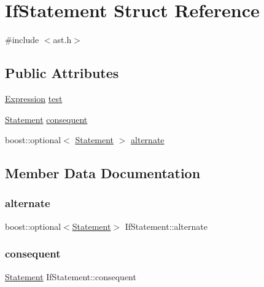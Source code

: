 \hypertarget{struct_if_statement}{}\section{If\+Statement Struct Reference}
\label{struct_if_statement}


{\ttfamily \#include $<$ast.\+h$>$}

\subsection*{Public Attributes}
\begin{DoxyCompactItemize}
\item 
\hyperlink{ast_8h_a4cb273a4d960cd13ea17d08f254493e8}{Expression} \hyperlink{struct_if_statement_aaabaa9e831e2bb8e0efac3b72e46ffc9}{test}
\item 
\hyperlink{ast_8h_a8b6ddf3732a0acd77e6b2509fb21a5fd}{Statement} \hyperlink{struct_if_statement_a3d850e94b88823553ee5bc81a28f0d55}{consequent}
\item 
boost\+::optional$<$ \hyperlink{ast_8h_a8b6ddf3732a0acd77e6b2509fb21a5fd}{Statement} $>$ \hyperlink{struct_if_statement_a34abc419c35b1bdab392dd63b09fd659}{alternate}
\end{DoxyCompactItemize}


\subsection{Member Data Documentation}
\mbox{\label{struct_if_statement_a34abc419c35b1bdab392dd63b09fd659}} 
\subsubsection{\texorpdfstring{alternate}{alternate}}
{\footnotesize\ttfamily boost\+::optional$<$\hyperlink{ast_8h_a8b6ddf3732a0acd77e6b2509fb21a5fd}{Statement}$>$ If\+Statement\+::alternate}

\mbox{\label{struct_if_statement_a3d850e94b88823553ee5bc81a28f0d55}} 
\subsubsection{\texorpdfstring{consequent}{consequent}}
{\footnotesize\ttfamily \hyperlink{ast_8h_a8b6ddf3732a0acd77e6b2509fb21a5fd}{Statement} If\+Statement\+::consequent}

